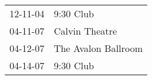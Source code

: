 \begin{supertabular}{p{0.25\columnwidth}p{0.75\columnwidth}}
 12-11-04 &            9:30 Club \\
 04-11-07 &       Calvin Theatre \\
 04-12-07 &  The Avalon Ballroom \\
 04-14-07 &            9:30 Club \\
\end{supertabular}

